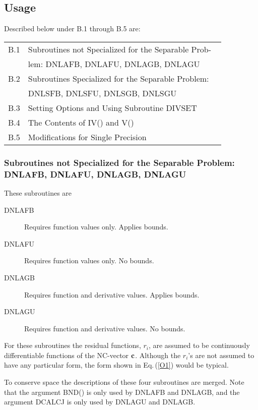 \documentclass[twoside]{MATH77}
\begin{document}
\subsection{Usage}

Described below under B.1 through B.5 are:
\begin{tabular*}{3.3in}{@{}l@{~}l}
B.1 &  Subroutines not Specialized for the Separable Prob-\\
 & lem: DNLAFB, DNLAFU, DNLAGB, DNLAGU \dotfill \pageref{PB1}\\
B.2 &  Subroutines Specialized for the Separable Problem:\ \ \\
 & DNLSFB, DNLSFU, DNLSGB, DNLSGU \dotfill \pageref{PB2}\\
B.3 &  Setting Options and Using Subroutine DIVSET \dotfill \pageref{PB3}\\
B.4 &  The Contents of IV() and V() \dotfill \pageref{PB4}\\
B.5 &  Modifications for Single Precision \dotfill \pageref{PB5}
\end{tabular*}
\subsubsection{Subroutines not Specialized for the Separable Problem: DNLAFB,
DNLAFU, DNLAGB, DNLAGU\label {PB1}}

These subroutines are
\begin{description}
\item[DNLAFB]  Requires function values only. Applies bounds.

\item[DNLAFU]  Requires function values only. No bounds.

\item[DNLAGB]  Requires function and derivative values. Applies bounds.

\item[DNLAGU]  Requires function and derivative values. No bounds.
\end{description}
For these subroutines the residual functions, $r_i$, are assumed to be
continuously differentiable functions of the NC-vector ${\bf c}$. Although
the $r_i$'s are not assumed to have any particular form, the form
shown in Eq.\,(\ref{O1}) would be typical.

To conserve space the descriptions of these four subroutines are merged.
Note that the argument BND() is only used by DNLAFB and DNLAGB, and the
argument DCALCJ is only used by DNLAGU and DNLAGB.
\end{document}
